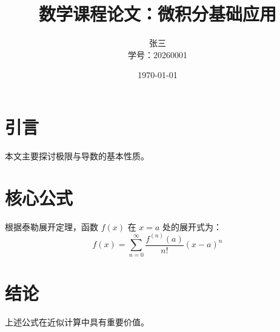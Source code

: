 \documentclass{article}
\title{数学课程论文：微积分基础应用}
\author{张三 \\ 学号：20260001}
\date{\today}
\begin{document}
\maketitle

\section{引言}
本文主要探讨极限与导数的基本性质。

\section{核心公式}
根据泰勒展开定理，函数 $f(x)$ 在 $x=a$ 处的展开式为：
\begin{equation}
    f(x) = \sum_{n=0}^{\infty} \frac{f^{(n)}(a)}{n!} (x-a)^n
\end{equation}

\section{结论}
上述公式在近似计算中具有重要价值。
\end{document}
